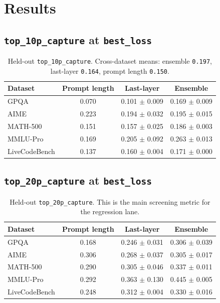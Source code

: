 \documentclass[11pt]{article}
\begin{document}
\section{Results}

\subsection*{\texttt{top\_10p\_capture} at \texttt{best\_loss}}

\begin{table}[h]
\centering
\small
\begin{tabular}{lccc}
\toprule
Dataset & Prompt length & Last-layer & Ensemble \\
\midrule
GPQA & 0.070 & 0.101 $\pm$ 0.009 & 0.169 $\pm$ 0.009 \\
AIME & 0.223 & 0.194 $\pm$ 0.032 & 0.195 $\pm$ 0.015 \\
MATH-500 & 0.151 & 0.157 $\pm$ 0.025 & 0.186 $\pm$ 0.003 \\
MMLU-Pro & 0.169 & 0.205 $\pm$ 0.092 & 0.263 $\pm$ 0.013 \\
LiveCodeBench & 0.137 & 0.160 $\pm$ 0.004 & 0.171 $\pm$ 0.000 \\
\bottomrule
\end{tabular}
\caption{Held-out \texttt{top\_10p\_capture}. Cross-dataset means: ensemble \texttt{0.197}, last-layer \texttt{0.164}, prompt length \texttt{0.150}.}
\end{table}

\subsection*{\texttt{top\_20p\_capture} at \texttt{best\_loss}}

\begin{table}[h]
\centering
\small
\begin{tabular}{lccc}
\toprule
Dataset & Prompt length & Last-layer & Ensemble \\
\midrule
GPQA & 0.168 & 0.246 $\pm$ 0.031 & 0.306 $\pm$ 0.039 \\
AIME & 0.306 & 0.268 $\pm$ 0.037 & 0.305 $\pm$ 0.017 \\
MATH-500 & 0.290 & 0.305 $\pm$ 0.046 & 0.337 $\pm$ 0.011 \\
MMLU-Pro & 0.292 & 0.363 $\pm$ 0.130 & 0.445 $\pm$ 0.005 \\
LiveCodeBench & 0.248 & 0.312 $\pm$ 0.004 & 0.330 $\pm$ 0.016 \\
\bottomrule
\end{tabular}
\caption{Held-out \texttt{top\_20p\_capture}. This is the main screening metric for the regression lane.}
\end{table}
\end{document}
